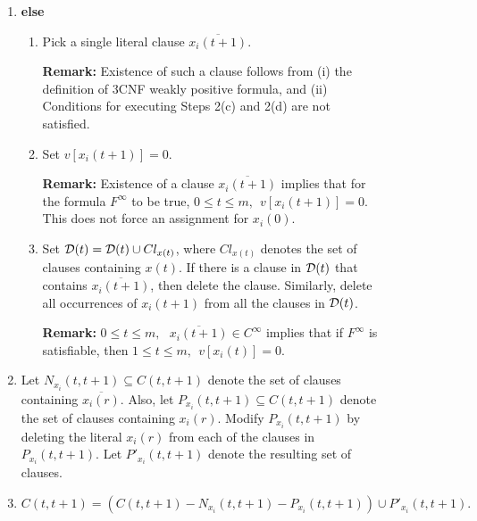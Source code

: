 {\begin{figure}[tbp]
\begin{enumerate}
\begin{enumerate}
\begin{enumerate}
\begin{enumerate}
\item
$t \leq r \leq t+1$, set $v[x_i(r)] = 0$.

\item
If there is a clause in ${\cal D}(t)$ 
that contains $\overline{x_i(r)}$, then delete the clause.
Similarly, delete all occurrences of $x_i(r)$ from all the clauses
in ${\cal D}(t)$.

\end{enumerate}


\item
{\bf else}

\begin{enumerate}
\item
Pick a single literal clause $\overline{x_i(t+1)}$.

\noindent
{\bf Remark:} Existence of such a clause follows from 
(i) the definition of 3CNF weakly positive formula, and 
(ii) Conditions for executing Steps 2(c) and 2(d) are not satisfied.

\item
Set $v[x_i(t+1)] = 0$.

\noindent
{\bf Remark:}
Existence of a clause $\overline{x_i(t+1)}$ 
implies that for the formula $F^{\infty}$ to be true, 
$0 \leq t \leq m,~~ v[x_i(t+1)] = 0$. This does not force an assignment for
$x_i(0)$.


\item
Set ${\cal D}(t) = {\cal D}(t) \cup Cl_{x(t)}$, where $Cl_{x(t)}$ denotes the
set of clauses containing $x(t)$.
If there is a clause in ${\cal D}(t)$ that contains $\overline{x_i(t+1)}$, 
then delete the clause.
Similarly, delete all occurrences of $x_i(t+1)$ 
from all the clauses in ${\cal D}(t)$.

\noindent
{\bf Remark:} $0 \leq t \leq m,~~~ \overline{x_i(t+1)} \in C^{\infty}$ 
implies that if $F^{\infty}$ is satisfiable,  then
$1 \leq t \leq m , ~~ v[x_i(t)] = 0$.
\end{enumerate}


\item
Let $N_{x_i}(t, t+1) \subseteq C(t, t+1)$ denote the set of clauses 
containing $\overline{x_i(r)}$. Also, let 
$P_{x_i}(t, t+1) \subseteq C(t, t+1)$ denote the set of clauses containing 
$x_i(r)$. Modify $P_{x_i}(t, t+1)$ by deleting the literal 
$x_i(r)$ from each of the clauses in $P_{x_i}(t, t+1)$. 
Let $P'_{x_i}(t, t+1)$ denote the resulting set of clauses.



\item $C(t,t+1) = \left( C(t, t+1) - N_{x_i}(t, t+1) - P_{x_i}(t, t+1) \right) 
\cup P'_{x_i}(t, t+1).$


\end{enumerate}
\end{enumerate}
\end{enumerate}
\end{figure}}
